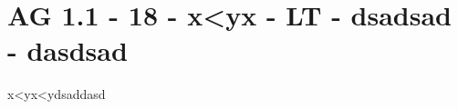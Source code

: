 \section{AG 1.1 - 18 - x<yx - LT - dsadsad - dasdsad}

\begin{beispiel}[AG 1.1]{1}
x<yx<ydsaddasd
\end{beispiel}